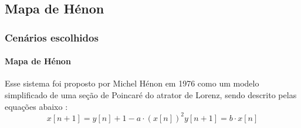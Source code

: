 \documentclass{beamer}
\begin{document}
\subsection{Mapa de Hénon}
\begin{frame}
	\frametitle{Cenários escolhidos}
	\framesubtitle{Mapa de Hénon}
	\justifying Esse sistema foi proposto por Michel Hénon em 1976 como um modelo simplificado de uma seção de Poincaré do atrator de Lorenz, sendo descrito pelas equações abaixo \cite{henon1976two}:
\begin{subequations}
\begin{equation}
x[n+1] = y[n] + 1 - a\cdot (x[n])^2
\end{equation}
\begin{equation}
y[n+1] = b \cdot x[n]
\end{equation}
\end{subequations}
\end{frame}
\end{document}
